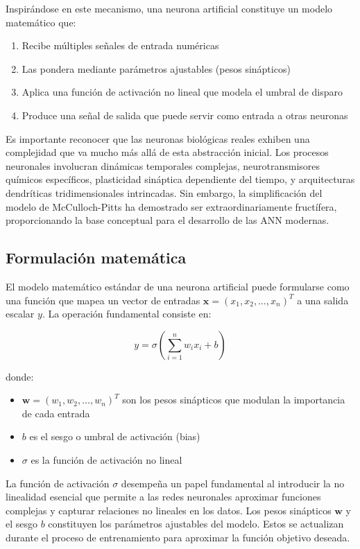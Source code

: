 Inspirándose en este mecanismo, una neurona artificial constituye un modelo matemático que:
\begin{enumerate}
	\item Recibe múltiples señales de entrada numéricas
	\item Las pondera mediante parámetros ajustables (pesos sinápticos)
	\item Aplica una función de activación no lineal que modela el umbral de disparo
	\item Produce una señal de salida que puede servir como entrada a otras neuronas
\end{enumerate}

Es importante reconocer que las neuronas biológicas reales exhiben una complejidad que va mucho más allá de esta abstracción inicial. Los procesos neuronales involucran dinámicas temporales complejas, neurotransmisores químicos específicos, plasticidad sináptica dependiente del tiempo, y arquitecturas dendríticas tridimensionales intrincadas. Sin embargo, la simplificación del modelo de McCulloch-Pitts ha demostrado ser extraordinariamente fructífera, proporcionando la base conceptual para el desarrollo de las \gls{ANN} modernas.

\subsection{Formulación matemática}

El modelo matemático estándar de una neurona artificial puede formularse como una función que mapea un vector de entradas \(\mathbf{x} = (x_1, x_2, \ldots, x_n)^T\) a una salida escalar \(y\). La operación fundamental consiste en:

\begin{equation}
	y = \sigma\left(\sum_{i=1}^{n} w_i x_i + b\right)
	\label{eq:neuron}
\end{equation}

donde:
\begin{itemize}
	\item \(\mathbf{w} = (w_1, w_2, \ldots, w_n)^T\) son los pesos sinápticos que modulan la importancia de cada entrada
	\item \(b\) es el sesgo o umbral de activación (bias)
	\item \(\sigma\) es la función de activación no lineal
\end{itemize}

La función de activación \(\sigma\) desempeña un papel fundamental al introducir la no linealidad esencial que permite a las redes neuronales aproximar funciones complejas y capturar relaciones no lineales en los datos. Los pesos sinápticos \(\mathbf{w}\) y el sesgo \(b\) constituyen los parámetros ajustables del modelo. Estos se actualizan durante el proceso de entrenamiento para aproximar la función objetivo deseada.

